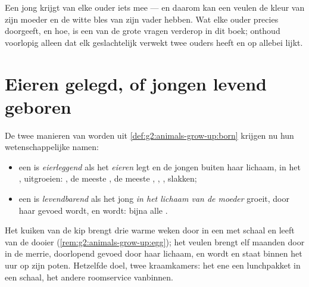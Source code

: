 \begin{remark}\label{rem:g4:animal-reproduction:mix}
Een jong  krijgt van elke ouder iets mee --- en daarom kan een
veulen de kleur van zijn moeder en de witte bles van zijn vader hebben.
Wat elke ouder precies doorgeeft, en hoe, is een van de grote vragen
verderop in dit boek; onthoud voorlopig alleen dat elk geslachtelijk
verwekt  twee ouders heeft en op allebei lijkt.
\end{remark}

\section{Eieren gelegd, of jongen levend geboren}

\begin{definition}\label{def:g4:animal-reproduction:ovivivi}
De twee manieren van  worden uit
\cref{def:g2:animals-grow-up:born} krijgen nu hun wetenschappelijke namen:
\begin{itemize}
  \item een  is \emph{eierleggend} als het
         \emph{eieren} legt en de jongen buiten haar lichaam,
        in het , uitgroeien: , de meeste , de meeste
        , , , slakken;
  \item een  is \emph{levendbarend} als het jong
        \emph{in het lichaam van de moeder} groeit, door haar gevoed
        wordt, en \emph{} wordt: bijna alle .
\end{itemize}
\end{definition}

\begin{example}\label{ex:g4:animal-reproduction:nurseries}
Het kuiken van de kip brengt drie warme weken door in een  met schaal
en leeft van de dooier (\cref{rem:g2:animals-grow-up:egg}); het veulen
brengt elf maanden door in de merrie, doorlopend gevoed door haar
lichaam, en wordt  en staat binnen het uur op zijn poten.
Hetzelfde doel, twee kraamkamers: het ene een lunchpakket in een schaal,
het andere roomservice vanbinnen.
\end{example}

